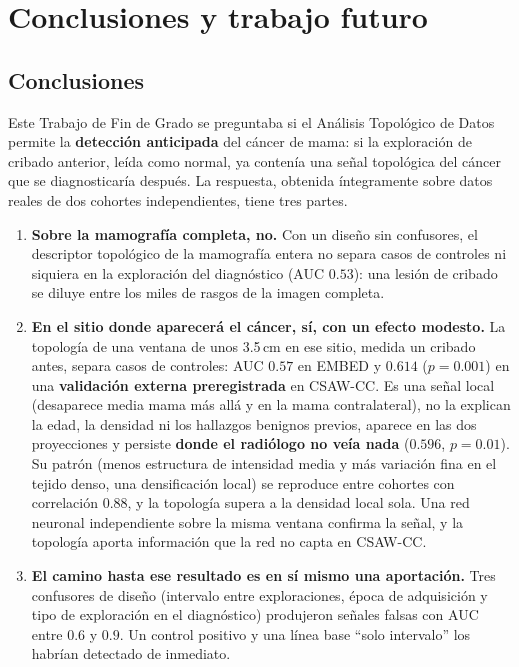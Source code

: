 \chapter{Conclusiones y trabajo futuro}
\label{cap:conclusiones}

\section{Conclusiones}
Este Trabajo de Fin de Grado se preguntaba si el Análisis Topológico de Datos
permite la \textbf{detección anticipada} del cáncer de mama: si la
exploración de cribado anterior, leída como normal, ya contenía una señal
topológica del cáncer que se diagnosticaría después. La respuesta, obtenida
íntegramente sobre datos reales de dos cohortes independientes, tiene tres
partes.

\begin{enumerate}
  \item \textbf{Sobre la mamografía completa, no.} Con un diseño sin
        confusores, el descriptor topológico de la mamografía entera no
        separa casos de controles ni siquiera en la exploración del
        diagnóstico (AUC $0.53$): una lesión de cribado se diluye entre los
        miles de rasgos de la imagen completa.
  \item \textbf{En el sitio donde aparecerá el cáncer, sí, con un efecto
        modesto.} La topología de una ventana de unos 3.5\,cm en ese sitio,
        medida un cribado antes, separa casos de controles: AUC $0.57$ en
        EMBED y $\mathbf{0.614}$ ($p = 0.001$) en una \textbf{validación
        externa preregistrada} en CSAW-CC. Es una señal local (desaparece
        media mama más allá y en la mama contralateral), no la explican la
        edad, la densidad ni los hallazgos benignos previos, aparece en las
        dos proyecciones y persiste \textbf{donde el radiólogo no veía nada}
        ($0.596$, $p = 0.01$). Su patrón (menos estructura de intensidad
        media y más variación fina en el tejido denso, una densificación
        local) se reproduce entre cohortes con correlación $0.88$, y la
        topología supera a la densidad local sola. Una red neuronal
        independiente sobre la misma ventana confirma la señal, y la
        topología aporta información que la red no capta en CSAW-CC.
  \item \textbf{El camino hasta ese resultado es en sí mismo una
        aportación.} Tres confusores de diseño (intervalo entre
        exploraciones, época de adquisición y tipo de exploración en el
        diagnóstico) produjeron señales falsas con AUC entre $0.6$ y $0.9$.
        Un control positivo y una línea base ``solo intervalo'' los habrían
        detectado de inmediato.
\end{enumerate}

